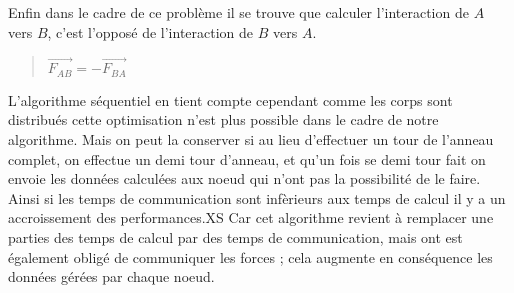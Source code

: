 \par Enfin dans le cadre de ce problème il se trouve que calculer l'interaction de $A$
vers $B$, c'est l'opposé de l'interaction de $B$ vers $A$.

\begin{quote}
  \begin{center}
    $ \overrightarrow{F_{AB}} = -\overrightarrow{F_{BA}} $
  \end{center}
\end{quote}

\par L'algorithme séquentiel en tient compte cependant comme les corps sont distribués
cette optimisation n'est plus possible dans le cadre de notre algorithme.
Mais on peut la conserver si au lieu d'effectuer un tour de l'anneau complet, on effectue
un demi tour d'anneau, et qu'un fois se demi tour fait on envoie les données calculées 
aux noeud qui n'ont pas la possibilité de le faire. Ainsi si les temps de communication
sont infèrieurs aux temps de calcul il y a un accroissement des performances.XS Car 
cet algorithme revient à remplacer une parties des temps de calcul par des temps de communication, 
mais ont est également obligé de communiquer les forces ; cela augmente en conséquence 
les données gérées par chaque noeud.\\
